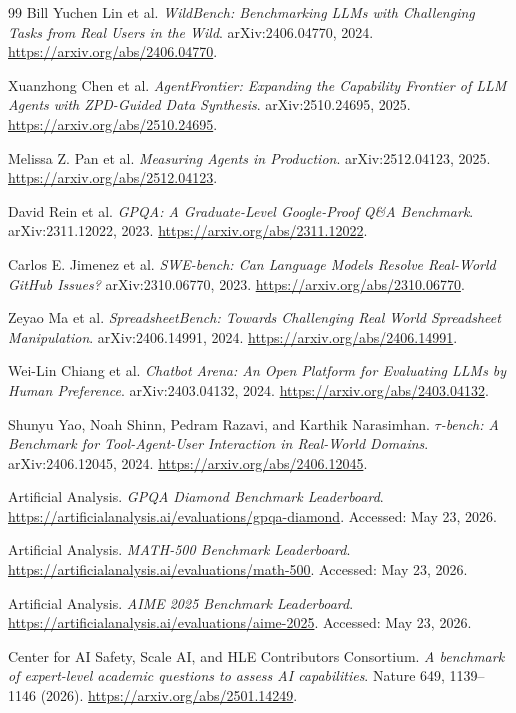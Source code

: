 \documentclass[10pt,letterpaper,twocolumn]{article}
\begin{document}
\begin{thebibliography}{99}
Bill Yuchen Lin et al.
\emph{WildBench: Benchmarking LLMs with Challenging Tasks from Real Users in the Wild}.
arXiv:2406.04770, 2024.
\url{https://arxiv.org/abs/2406.04770}.

Xuanzhong Chen et al.
\emph{AgentFrontier: Expanding the Capability Frontier of LLM Agents with ZPD-Guided Data Synthesis}.
arXiv:2510.24695, 2025.
\url{https://arxiv.org/abs/2510.24695}.

Melissa Z. Pan et al.
\emph{Measuring Agents in Production}.
arXiv:2512.04123, 2025.
\url{https://arxiv.org/abs/2512.04123}.

David Rein et al.
\emph{GPQA: A Graduate-Level Google-Proof Q\&A Benchmark}.
arXiv:2311.12022, 2023.
\url{https://arxiv.org/abs/2311.12022}.

Carlos E. Jimenez et al.
\emph{SWE-bench: Can Language Models Resolve Real-World GitHub Issues?}
arXiv:2310.06770, 2023.
\url{https://arxiv.org/abs/2310.06770}.

Zeyao Ma et al.
\emph{SpreadsheetBench: Towards Challenging Real World Spreadsheet Manipulation}.
arXiv:2406.14991, 2024.
\url{https://arxiv.org/abs/2406.14991}.

Wei-Lin Chiang et al.
\emph{Chatbot Arena: An Open Platform for Evaluating LLMs by Human Preference}.
arXiv:2403.04132, 2024.
\url{https://arxiv.org/abs/2403.04132}.

Shunyu Yao, Noah Shinn, Pedram Razavi, and Karthik Narasimhan.
\emph{$\tau$-bench: A Benchmark for Tool-Agent-User Interaction in
Real-World Domains}. arXiv:2406.12045, 2024.
\url{https://arxiv.org/abs/2406.12045}.

Artificial Analysis. \emph{GPQA Diamond Benchmark Leaderboard}.
\url{https://artificialanalysis.ai/evaluations/gpqa-diamond}. Accessed: May 23, 2026.

Artificial Analysis. \emph{MATH-500 Benchmark Leaderboard}.
\url{https://artificialanalysis.ai/evaluations/math-500}. Accessed: May 23, 2026.

Artificial Analysis. \emph{AIME 2025 Benchmark Leaderboard}.
\url{https://artificialanalysis.ai/evaluations/aime-2025}. Accessed: May 23, 2026.

Center for AI Safety, Scale AI, and HLE Contributors Consortium. 
\emph{A benchmark of expert-level academic questions to assess AI capabilities}. 
Nature 649, 1139–1146 (2026).
\url{https://arxiv.org/abs/2501.14249}.


\end{thebibliography}
\end{document}
